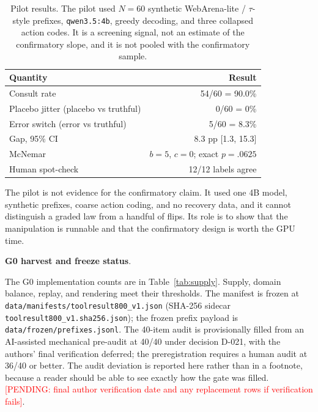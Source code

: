 \documentclass[a4paper,fleqn]{cas-sc}
\newcommand{\pending}[1]{\textcolor{red}{[PENDING: #1]}}
\begin{document}
\begin{table}[pos=htbp]
  \centering
  \caption{Pilot results. The pilot used $N=60$ synthetic WebArena-lite / $\tau$-style prefixes,
  \texttt{qwen3.5:4b}, greedy decoding, and three collapsed action codes. It is a screening
  signal, not an estimate of the confirmatory slope, and it is not pooled with the confirmatory
  sample.}
  \label{tab:pilot}
  \small
  \begin{tabular}{>{\raggedright\arraybackslash}p{7.4cm}r}
    \toprule
    \textbf{Quantity} & \textbf{Result} \\
    \midrule
    Consult rate                              & 54/60 = 90.0\% \\
    Placebo jitter (placebo vs truthful)      & 0/60 = 0\% \\
    Error switch (error vs truthful)          & 5/60 = 8.3\% \\
    Gap, 95\% CI                              & 8.3 pp [1.3, 15.3] \\
    McNemar                                   & $b=5$, $c=0$; exact $p=.0625$ \\
    Human spot-check                          & 12/12 labels agree \\
    \bottomrule
  \end{tabular}
\end{table}

The pilot is not evidence for the confirmatory claim. It used one 4B model, synthetic prefixes,
coarse action coding, and no recovery data, and it cannot distinguish a graded law from a handful
of flips. Its role is to show that the manipulation is runnable and that the confirmatory design
is worth the GPU time.

\noindent\textbf{G0 harvest and freeze status}.\

The G0 implementation counts are in Table~\ref{tab:supply}. Supply, domain balance, replay, and
rendering meet their thresholds. The manifest is frozen at
\texttt{data/manifests/toolresult800\_v1.json} (SHA-256 sidecar
\texttt{toolresult800\_v1.sha256.json}); the frozen prefix payload is
\texttt{data/frozen/prefixes.jsonl}. The 40-item audit is provisionally filled from an AI-assisted
mechanical pre-audit at 40/40 under decision D-021, with the authors' final verification deferred;
the preregistration requires a human audit at 36/40 or better. The audit deviation is reported
here rather than in a footnote, because a reader should be able to see exactly how the gate was
filled. \pending{final author verification date and any replacement rows if verification fails}.
\end{document}
